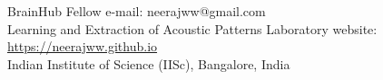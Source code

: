 \documentclass[line]{resume}
\begin{document}
\small{
\begin{resume}
    \setcounter{page}{1}
     \vspace{-4.5mm}
    \vspace{1mm}
    BrainHub Fellow            					\hfill e-mail: neerajww@gmail.com \\
    Learning and Extraction of Acoustic Patterns Laboratory     \hfill website: \url{https://neerajww.github.io}\\
    Indian Institute of Science (IISc), Bangalore, India              \\\vspace{-4.5mm}%
     \vspace{-2.5mm}

\end{resume}}
\end{document}
